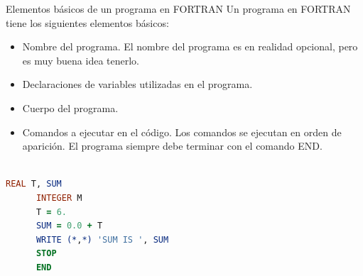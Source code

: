 \documentclass{article}
\begin{document}
Elementos básicos de un programa en FORTRAN 
Un programa en FORTRAN tiene los siguientes elementos básicos: 
\begin{itemize}
\item Nombre del programa. El nombre del programa es en realidad opcional, pero es muy buena idea tenerlo.
\item Declaraciones de variables utilizadas en el programa. 
\item Cuerpo del programa. 
\item Comandos a ejecutar en el código. 
Los comandos se ejecutan en orden de aparición. 
El programa siempre debe terminar con el comando END.
\end{itemize}

	
		\begin{lstlisting}[language=Fortran, basicstyle=\small,caption={Fortran}]

REAL T, SUM
      INTEGER M
      T = 6.
      SUM = 0.0 + T
      WRITE (*,*) 'SUM IS ', SUM
      STOP
      END
		   \end{lstlisting}
	
	\clearpage
	
	
		
	
\end{document}
